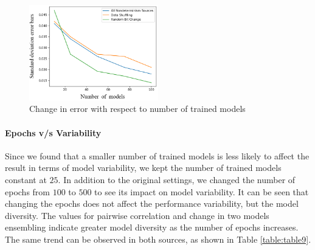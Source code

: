 \begin{figure}[!htb]
	\centering
	\includegraphics[width=0.5\textwidth]{graph_1.png}
	\caption{Change in error with respect to number of trained models }
	\label{fig:pic1}	
    \end{figure}
\paragraph{Epochs v/s Variability}
Since we found that a smaller number of trained models is less likely to affect the result in terms of model variability, we kept the number of trained models constant at $25$. In addition to the original settings, we changed the number of epochs from $100$ to $500$ to see its impact on model variability. It can be seen that changing the epochs does not affect the performance variability, but the model diversity. The values for pairwise correlation and change in two models ensembling indicate greater model diversity as the number of epochs increases. The same trend can be observed in both sources, as shown in Table \ref{table:table9}.
